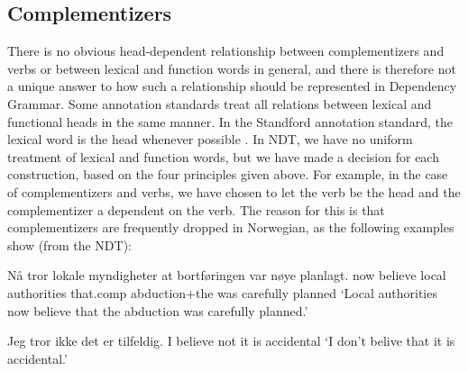 \documentclass[11pt,a4paper]{article}
\begin{document}
\subsection{Complementizers}
There is no obvious head-dependent relationship between complementizers and verbs or between lexical and function words in general, and there is therefore not a unique answer to how such a relationship should be represented in Dependency Grammar.
Some annotation standards treat all relations between lexical and functional heads in the same manner. In the Standford annotation standard, the lexical word is the head whenever possible \cite[2]{Mar:Man:08}.
In NDT, we have no uniform treatment of lexical and function words, but we have made a decision for each construction, based on the four principles given above. For example, in the case of complementizers and verbs, we have chosen to let the verb be the head and the complementizer a dependent on the verb. The reason for this is that
complementizers are frequently dropped in Norwegian, as the following examples show (from the NDT):
\begin{examples}
\item\label{ex:medat}
\gll Nå tror lokale myndigheter at bortføringen var nøye planlagt.
now believe local authorities that.comp abduction+the was carefully planned
\glt `Local authorities now believe that the abduction was carefully planned.'
\glend

\item\label{ex:utenat}
\gll Jeg tror ikke det er tilfeldig.
I believe not it is accidental
\glt `I don't belive that it is accidental.'
\glend
\end{examples}
\end{document}
